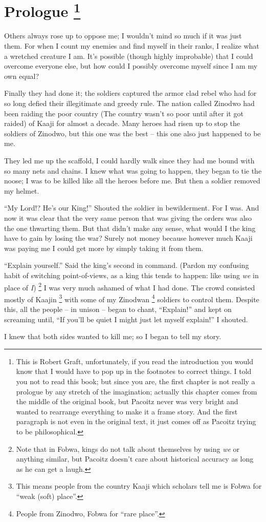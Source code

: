 \chapter[Prologue]{Prologue
\footnote{This is Robert Graft, unfortunately, if you read the introduction you would know that I would have to pop up in the footnotes to correct things. I told you not to read this book; but since you are, the first chapter is not really a prologue by any stretch of the imagination; actually this chapter comes from the middle of the original book, but Pa\-co\-itz never was very bright and wanted to rearrange everything to make it a frame story. And the first paragraph is not even in the original text, it just comes off as Pa\-co\-itz trying to be philosophical.}
}

Others always rose up to oppose me;
I wouldn't mind so much if it was just them.
For when I count my enemies and find myself in their ranks, I realize what a wretched creature I am.
It's possible (though highly improbable) that I could overcome everyone else, but how could I possibly overcome myself since I am my own equal?

\tbreak

Finally they had done it;
the soldiers captured the armor clad rebel who had for so long defied their illegitimate and greedy rule.
The nation called Zi\-no\-dwo had been raiding the poor country (The country wasn't so poor until after it got raided) of Kaa\-ji for almost a decade.
Many heroes had risen up to stop the soldiers of Zi\-no\-dwo, but this one was the best -- this one also just happened to be me.

They led me up the scaffold, I could hardly walk since they had me bound with so many nets and chains. I knew what was going to happen, they began to tie the noose; I was to be killed like all the heroes before me. But then a soldier removed my helmet.

``My Lord!? He's our King!'' Shouted the soldier in bewilderment.
For I was.
And now it was clear that the very same person that was giving the orders was also the one thwarting them.
But that didn't make any sense, what would I the king have to gain by losing the war? Surely not money because however much Kaa\-ji was paying me I could get more by simply taking it from them.

\indent ``Explain yourself.'' Said the king's second in command.
(Pardon my confusing habit of switching point-of-views, as a king this tends to happen: like using \emph{we} in place of \emph{I})
\footnote{Note that in Fo\-bwa, kings do not talk about themselves by using \emph{we} or anything similar, but Pa\-co\-itz doesn't care about historical accuracy as long as he can get a laugh.}
I was very much ashamed of what I had done.
The crowd consisted mostly of Kaa\-jin
\footnote{This means people from the country Kaa\-ji which scholars tell me is Fo\-bwa for ``weak (soft) place''.} with some of my Zi\-no\-dwan
\footnote{People from Zi\-no\-dwo, Fo\-bwa for ``rare place''.} soldiers to control them. Despite this, all the people -- in unison -- began to chant, ``Explain!'' and kept on screaming until, ``If you'll be quiet I might just let myself explain!'' I shouted. 

I knew that both sides wanted to kill me; so I began to tell my story.
